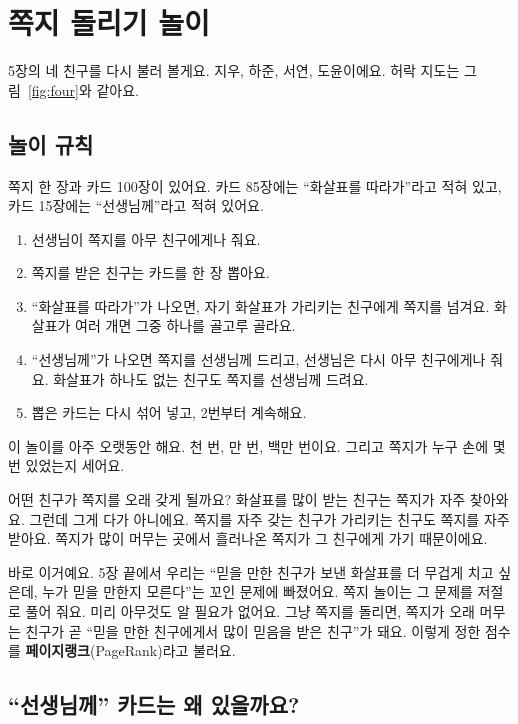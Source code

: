 \chapter{쪽지 돌리기 놀이}

5장의 네 친구를 다시 불러 볼게요.
지우, 하준, 서연, 도윤이에요.
허락 지도는 그림~\ref{fig:four}와 같아요.

\section{놀이 규칙}

쪽지 한 장과 카드 100장이 있어요.
카드 85장에는 “화살표를 따라가”라고 적혀 있고,
카드 15장에는 “선생님께”라고 적혀 있어요.

\begin{enumerate}
\item 선생님이 쪽지를 아무 친구에게나 줘요.
\item 쪽지를 받은 친구는 카드를 한 장 뽑아요.
\item “화살표를 따라가”가 나오면, 자기 화살표가 가리키는 친구에게 쪽지를 넘겨요.
      화살표가 여러 개면 그중 하나를 골고루 골라요.
\item “선생님께”가 나오면 쪽지를 선생님께 드리고, 선생님은 다시 아무 친구에게나 줘요.
      화살표가 하나도 없는 친구도 쪽지를 선생님께 드려요.
\item 뽑은 카드는 다시 섞어 넣고, 2번부터 계속해요.
\end{enumerate}

이 놀이를 아주 오랫동안 해요.
천 번, 만 번, 백만 번이요.
그리고 쪽지가 누구 손에 몇 번 있었는지 세어요.

어떤 친구가 쪽지를 오래 갖게 될까요?
화살표를 많이 받는 친구는 쪽지가 자주 찾아와요.
그런데 그게 다가 아니에요.
쪽지를 자주 갖는 친구가 가리키는 친구도 쪽지를 자주 받아요.
쪽지가 많이 머무는 곳에서 흘러나온 쪽지가 그 친구에게 가기 때문이에요.

바로 이거예요.
5장 끝에서 우리는 “믿을 만한 친구가 보낸 화살표를 더 무겁게 치고 싶은데,
누가 믿을 만한지 모른다”는 꼬인 문제에 빠졌어요.
쪽지 놀이는 그 문제를 저절로 풀어 줘요.
미리 아무것도 알 필요가 없어요.
그냥 쪽지를 돌리면, 쪽지가 오래 머무는 친구가 곧 “믿을 만한 친구에게서 많이 믿음을 받은 친구”가 돼요.
이렇게 정한 점수를 \textbf{페이지랭크}(PageRank)라고 불러요.

\section{“선생님께” 카드는 왜 있을까요?}


